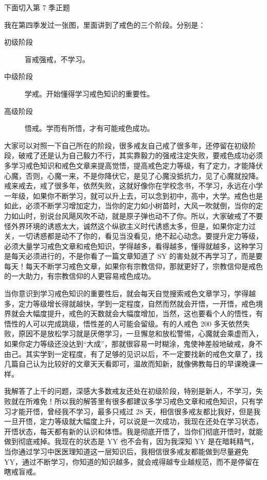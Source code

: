 \documentclass[fontset=founder]{ctexart}
\begin{document}
下面切入第 7 季正题

我在第四季发过一张图，里面讲到了戒色的三个阶段。分别是：

\begin{description}
    \item[初级阶段] 盲戒强戒，不学习。
    \item[中级阶段] 学戒。开始懂得学习戒色知识的重要性。
    \item[高级阶段] 悟戒。学而有所悟，才有可能戒色成功。
\end{description}

大家可以对照一下自己所在的阶段，很多戒友自己戒了很多年，还停留在初级阶段，破戒了还是认为自己毅力不行，其实靠毅力的强戒注定失败，要戒色成功必须多学习戒色知识和戒色文章来提高觉悟，提高戒色定力等级，有了定力，才能降伏心魔，否则，心魔一来，不是你降伏它，是见了心魔没抵抗力，见了心魔就投降。戒来戒去，戒了很多年，依然失败，这就好像你在学校念书，不学习，永远在小学一年级，如果你不断学习，就可以升上去，可以念到初中，高中，大学。戒色也是如此，必须不断学习增加定力，当你的定力如小树苗时，大风一吹就倒，当你的定力如山时，别说台风飓风吹不动，就是原子弹也动不了你。所以，大家破戒了不要怪外界环境的诱惑太大，诚然这个纵欲主义时代诱惑太多，但是，如果你定力过关，一切诱惑都是动不了你的，看见当没看见，绝不起心动念。要提升定力等级，必须大量学习戒色文章和戒色知识，学得越多，看得越多，懂得就越多，这种学习是每天必须进行的，不是你看了一篇文章知道了 SY 的害处就不再学习了，而是要每天！每天不断学习戒色文章，如果你有宗教信仰，那就更好了，宗教信仰是戒色的一大助力，有宗教信仰的人更容易戒色成功。

当你意识到学习戒色知识的重要性后，就会每天自觉搜索戒色文章学习，学得越多，定力等级增长得就越快，学到一定程度，自然而然就会开悟，一开悟，戒色境界就会大幅度提升，戒色的天数就会大幅度增加，当然，这也要看个人的悟性，有悟性的人可以完成跳级，悟性差的人可能会留级。有的人戒色 200 多天依然失败，原因不是放松学习就是厌倦学习，一旦懈怠和放松警惕，心魔就会乘虚而入，如果你定力等级还没达到“大成”，那就很容易一时糊涂，鬼使神差般地破戒，身不由己。其实学到一定程度，有了足够的见识以后，不一定要找新的戒色文章了，找几篇自己认为比较好的文章天天看即可，温故而知新，就像佛教每日的早课晚课一样。

我解答了上千的问题，深感大多数戒友还处在初级阶段，特别是新人，不学习，失败就在所难免！所以我的解答里有很多都建议多学习戒色文章和戒色知识，只有学习才能开悟，曾经我不学习，最多只戒过 28 天，相信很多戒友都比我好，但是我一旦开悟，定力等级就大幅度上升，可以说是一次成功，我现在还处在学习状态，开悟状态，每天都有新的认识和体悟。我是彻底开悟了，当你们彻底开悟时，就能做到彻底戒掉。我现在的状态是 YY 也不会有，因为我深知 YY 是在暗耗精气，当你通过学习中医医理知道这一层知识后，我相信很多戒友都能做到尽量避免 YY，通过不断学习，你知道的知识越多，就会戒得越专业越规范，而不是停留在瞎戒盲戒。
\end{document}
